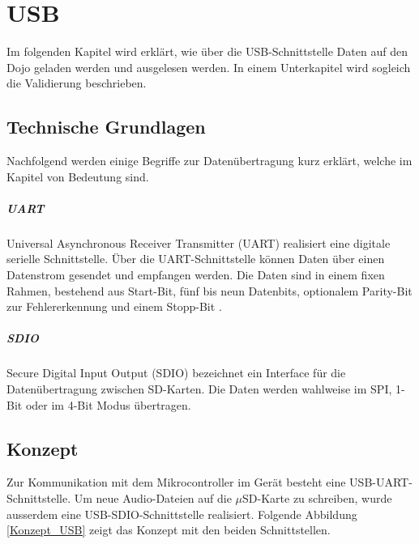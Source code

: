 \chapter{USB}
\label{USB}
\thispagestyle{fancy}  

Im folgenden Kapitel wird erklärt, wie über die USB-Schnittstelle Daten auf den Dojo geladen werden und ausgelesen werden. In einem Unterkapitel wird sogleich die Validierung beschrieben. 

\section{Technische Grundlagen}

Nachfolgend werden einige Begriffe zur Datenübertragung kurz erklärt, welche im Kapitel von Bedeutung sind.

\paragraph{UART}
Universal Asynchronous Receiver Transmitter (UART) realisiert eine digitale serielle Schnittstelle. Über die UART-Schnittstelle können Daten über einen Datenstrom gesendet und empfangen werden. Die Daten sind in einem fixen Rahmen, bestehend aus Start-Bit, fünf bis neun Datenbits, optionalem Parity-Bit zur Fehlererkennung und einem Stopp-Bit \cite{UARTdefinition}.

\paragraph{SDIO}
Secure Digital Input Output (SDIO) bezeichnet ein Interface für die Datenübertragung zwischen SD-Karten. Die Daten werden wahlweise im SPI, 1-Bit oder im 4-Bit Modus übertragen.

\section{Konzept}

Zur Kommunikation mit dem Mikrocontroller im Gerät besteht eine USB-UART-Schnittstelle. Um neue Audio-Dateien auf die $\mu$SD-Karte zu schreiben, wurde ausserdem eine USB-SDIO-Schnittstelle realisiert. Folgende Abbildung \ref{Konzept_USB} zeigt das Konzept mit den beiden Schnittstellen.

